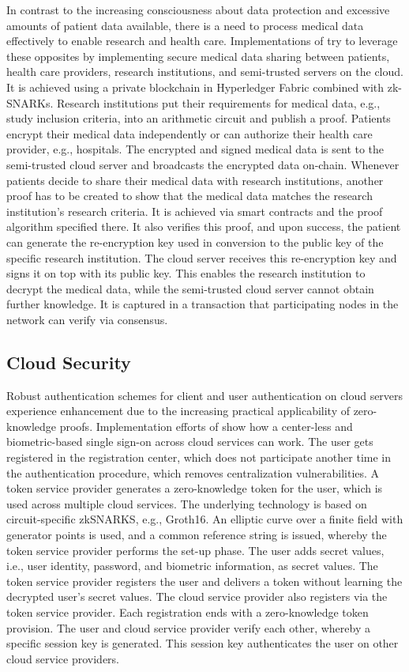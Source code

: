 In contrast to the increasing consciousness about data protection and excessive amounts of patient data available, there is a need to process medical data effectively to enable research and health care. Implementations of \citet{Huangetal} try to leverage these opposites by implementing secure medical data sharing between patients, health care providers, research institutions, and semi-trusted servers on the cloud. It is achieved using a private blockchain in Hyperledger Fabric combined with zk-SNARKs. Research institutions put their requirements for medical data, e.g., study inclusion criteria, into an arithmetic circuit and publish a proof. Patients encrypt their medical data independently or can authorize their health care provider, e.g., hospitals. The encrypted and signed medical data is sent to the semi-trusted cloud server and broadcasts the encrypted data on-chain. Whenever patients decide to share their medical data with research institutions, another proof has to be created to show that the medical data matches the research institution's research criteria. It is achieved via smart contracts and the proof algorithm specified there. It also verifies this proof, and upon success, the patient can generate the re-encryption key used in conversion to the public key of the specific research institution. The cloud server receives this re-encryption key and signs it on top with its public key. This enables the research institution to decrypt the medical data, while the semi-trusted cloud server cannot obtain further knowledge. It is captured in a transaction that participating nodes in the network can verify via consensus.

\subsection{Cloud Security}
Robust authentication schemes for client and user authentication on cloud servers experience enhancement due to the increasing practical applicability of zero-knowledge proofs. Implementation efforts of \citet{LiuWangPengXing} show how a center-less and biometric-based single sign-on across cloud services can work. The user gets registered in the registration center, which does not participate another time in the authentication procedure, which removes centralization vulnerabilities. A token service provider generates a zero-knowledge token for the user, which is used across multiple cloud services. The underlying technology is based on circuit-specific zkSNARKS, e.g., Groth16. An elliptic curve over a finite field with generator points is used, and a common reference string is issued, whereby the token service provider performs the set-up phase. The user adds secret values, i.e., user identity, password, and biometric information, as secret values. The token service provider registers the user and delivers a token without learning the decrypted user's secret values. The cloud service provider also registers via the token service provider. Each registration ends with a zero-knowledge token provision. The user and cloud service provider verify each other, whereby a specific session key is generated. This session key authenticates the user on other cloud service providers.  

